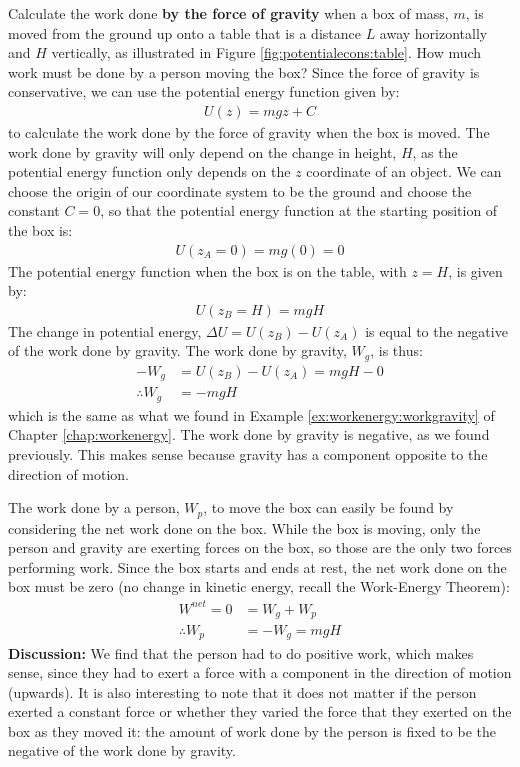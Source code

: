\begin{example}{Calculate the work done \textbf{by the force of gravity} when a box of mass, $m$, is moved from the ground up onto a table that is a distance $L$ away horizontally and $H$ vertically, as illustrated in Figure \ref{fig:potentialecons:table}. How much work must be done by a person moving the box?}
Since the force of gravity is conservative, we can use the potential energy function given by:
\begin{align*}
U(z)=mgz+C
\end{align*}
to calculate the work done by the force of gravity when the box is moved. The work done by gravity will only depend on the change in height, $H$, as the potential energy function only depends on the $z$ coordinate of an object.  We can choose the origin of our coordinate system to be the ground and choose the constant $C=0$, so that the potential energy function at the starting position of the box is:
\begin{align*}
U(z_A=0) = mg(0)= 0
\end{align*}
The potential energy function when the box is on the table, with $z=H$, is given by:
\begin{align*}
U(z_B=H) = mgH
\end{align*}
The change in potential energy, $\Delta U = U(z_B) - U(z_A)$ is equal to the negative of the work done by gravity. The work done by gravity, $W_g$, is thus:
\begin{align*}
-W_g &=  U(z_B) - U(z_A) = mgH - 0\\
\therefore W_g &= -mgH
\end{align*}
which is the same as what we found in Example \ref{ex:workenergy:workgravity} of Chapter \ref{chap:workenergy}. The work done by gravity is negative, as we found previously. This makes sense because gravity has a component opposite to the direction of motion.  

The work done by a person, $W_p$, to move the box can easily be found by considering the net work done on the box. While the box is moving, only the person and gravity are exerting forces on the box, so those are the only two forces performing work. Since the box starts and ends at rest, the net work done on the box must be zero (no change in kinetic energy, recall the Work-Energy Theorem):
\begin{align*}
W^{net} = 0 &= W_g + W_p\\
\therefore W_p &= -W_g = mgH
\end{align*}
\textbf{Discussion:} We find that the person had to do positive work, which makes sense, since they had to exert a force with a component in the direction of motion (upwards). It is also interesting to note that it does not matter if the person exerted a constant force or whether they varied the force that they exerted on the box as they moved it: the amount of work done by the person is fixed to be the negative of the work done by gravity.
\end{example}

